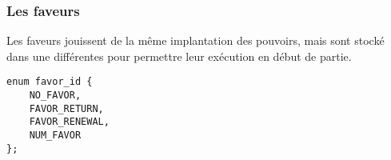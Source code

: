 
\subsubsection{Les faveurs}
\label{favors}

Les faveurs jouissent de la même implantation des pouvoirs, mais sont stocké dans une  différentes pour permettre leur exécution en début de partie.

\begin{lstlisting}[frame=single, caption={Enumération des faveurs}]
enum favor_id {
	NO_FAVOR,
	FAVOR_RETURN,
	FAVOR_RENEWAL,
	NUM_FAVOR
};
\end{lstlisting}
